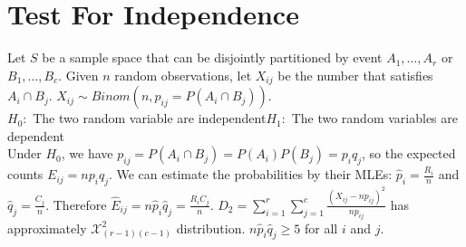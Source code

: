 \documentclass{article}
\begin{document}
\section{Test For Independence}
\label{sec:independence}
Let $S$ be a sample space that can be disjointly partitioned by event $A_1,\dots,A_r$ or $B_1,\dots,B_c$. Given $n$ random observations, let $X_{ij}$ be the number that satisfies $A_i\cap B_j$. $X_{ij}\sim Binom(n,p_{ij}=P(A_i\cap B_j))$.\\
\newline
$H_0:$ The two random variable are independent\hspace*{0.5in}$H_1:$ The two random variables are dependent\\
Under $H_0$, we have $p_{ij}=P(A_i\cap B_j)=P(A_i)P(B_j)=p_iq_j$, so the expected counts $E_{ij}=np_iq_j$. We can estimate the probabilities by their MLEs: $\hat p_i=\frac{R_i}{n}$ and $\hat q_j=\frac{C_j}{n}$. Therefore $\hat E_{ij}=n\hat p_i\hat q_j=\frac{R_iC_j}{n}$. $D_2=\sum_{i=1}^r\sum_{j=1}^c\frac{(X_{ij}-np_{ij})^2}{np_{ij}}$ has approximately $\mathcal{X}^2_{(r-1)(c-1)}$ distribution. $n\hat p_i\hat q_j\geq 5$ for all $i$ and $j$.
\end{document}
